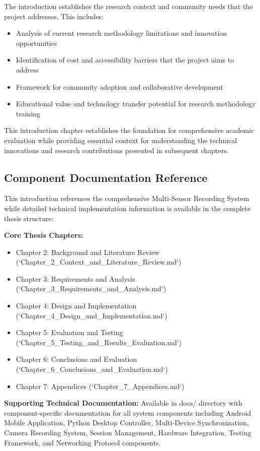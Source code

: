 \documentclass[12pt,a4paper]{article}
\begin{document}
The introduction establishes the research context and community needs that the project addresses. This includes:

\begin{itemize}
\item Analysis of current research methodology limitations and innovation opportunities
\item Identification of cost and accessibility barriers that the project aims to address
\item Framework for community adoption and collaborative development
\item Educational value and technology transfer potential for research methodology training

\end{itemize}
This introduction chapter establishes the foundation for comprehensive academic evaluation while providing essential
context for understanding the technical innovations and research contributions presented in subsequent chapters.

\subsection{Component Documentation Reference}

This introduction references the comprehensive Multi-Sensor Recording System while detailed technical implementation
information is available in the complete thesis structure:

\textbf{Core Thesis Chapters:}

\begin{itemize}
\item Chapter 2: Background and Literature Review (`Chapter_2_Context_and_Literature_Review.md`)
\item Chapter 3: Requirements and Analysis (`Chapter_3_Requirements_and_Analysis.md`)
\item Chapter 4: Design and Implementation (`Chapter_4_Design_and_Implementation.md`)
\item Chapter 5: Evaluation and Testing (`Chapter_5_Testing_and_Results_Evaluation.md`)
\item Chapter 6: Conclusions and Evaluation (`Chapter_6_Conclusions_and_Evaluation.md`)
\item Chapter 7: Appendices (`Chapter_7_Appendices.md`)

\end{itemize}
\textbf{Supporting Technical Documentation:}
Available in docs/ directory with component-specific documentation for
all system components including Android Mobile Application, Python Desktop Controller, Multi-Device Synchronization,
Camera Recording System, Session Management, Hardware Integration, Testing Framework, and Networking Protocol
components.
\end{document}
